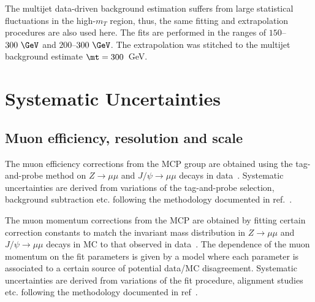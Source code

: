 The multijet data-driven background estimation suffers from large statistical fluctuations in the high-$m_T$ region, thus, the same fitting and extrapolation procedures are also used here.
The fits are performed in the ranges of $150$--$300~\GeV$ and $200$--$300~\GeV$.
The extrapolation was stitched to the multijet background estimate $\mt=300$~GeV.



\section{Systematic Uncertainties}
\label{sec:wprimeSystematics}
\subsection{Muon efficiency, resolution and scale}
The muon efficiency corrections from the MCP group are obtained using the tag-and-probe method
on $Z\to\mu\mu$ and $J/\psi\to\mu\mu$ decays in data~\cite{MCP13TeV}. Systematic uncertainties
are derived from variations of the tag-and-probe selection, background subtraction etc. following
the methodology documented in ref.~\cite{MCPrun1}.

The muon momentum corrections from the MCP are obtained by fitting certain correction constants 
to match the invariant mass distribution in $Z\to\mu\mu$ and $J/\psi\to\mu\mu$ decays in MC
to that observed in data~\cite{MCP13TeV}. The dependence of the muon momentum on the fit parameters
is given by a model where each parameter is associated to a certain source of potential data/MC disagreement.
Systematic uncertainties are derived from variations of the fit procedure, alignment studies etc. 
following the methodology documented in ref~\cite{MCPrun1}.


